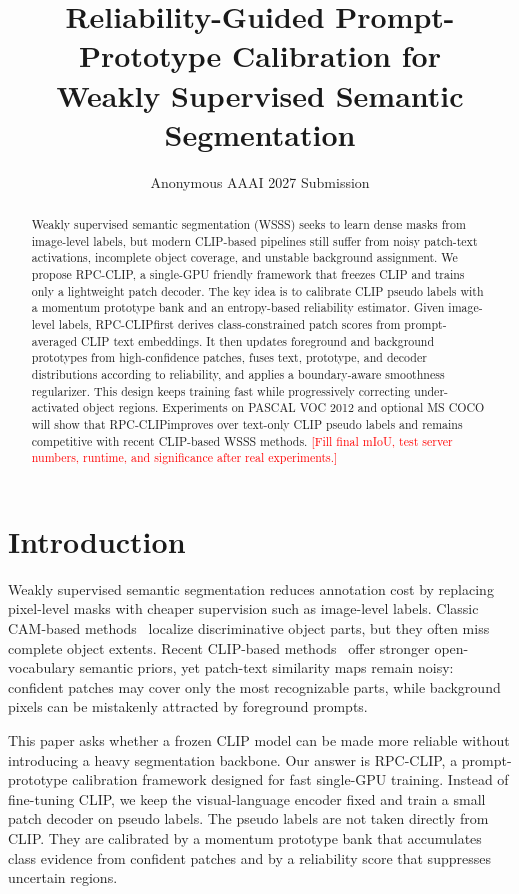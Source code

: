 \documentclass[letterpaper]{article}
\title{Reliability-Guided Prompt-Prototype Calibration for\\Weakly Supervised Semantic Segmentation}
\author{Anonymous AAAI 2027 Submission}
\newcommand{\method}{RPC-CLIP}
\newcommand{\todo}[1]{\textcolor{red}{[#1]}}
\begin{document}
\maketitle

\begin{abstract}
Weakly supervised semantic segmentation (WSSS) seeks to learn dense masks from
image-level labels, but modern CLIP-based pipelines still suffer from noisy
patch-text activations, incomplete object coverage, and unstable background
assignment. We propose \method, a single-GPU friendly framework that freezes
CLIP and trains only a lightweight patch decoder. The key idea is to calibrate
CLIP pseudo labels with a momentum prototype bank and an entropy-based
reliability estimator. Given image-level labels, \method first derives
class-constrained patch scores from prompt-averaged CLIP text embeddings. It then
updates foreground and background prototypes from high-confidence patches, fuses
text, prototype, and decoder distributions according to reliability, and applies
a boundary-aware smoothness regularizer. This design keeps training fast while
progressively correcting under-activated object regions. Experiments on PASCAL
VOC 2012 and optional MS COCO will show that \method improves over text-only
CLIP pseudo labels and remains competitive with recent CLIP-based WSSS methods.
\todo{Fill final mIoU, test server numbers, runtime, and significance after
real experiments.}
\end{abstract}

\section{Introduction}
Weakly supervised semantic segmentation reduces annotation cost by replacing
pixel-level masks with cheaper supervision such as image-level labels. Classic
CAM-based methods~\cite{zhou2016cam} localize discriminative object parts, but
they often miss complete object extents. Recent CLIP-based
methods~\cite{radford2021clip,lin2023clipes,zhang2024weclip} offer stronger
open-vocabulary semantic priors, yet patch-text similarity maps remain noisy:
confident patches may cover only the most recognizable parts, while background
pixels can be mistakenly attracted by foreground prompts.

This paper asks whether a frozen CLIP model can be made more reliable without
introducing a heavy segmentation backbone. Our answer is \method, a
prompt-prototype calibration framework designed for fast single-GPU training.
Instead of fine-tuning CLIP, we keep the visual-language encoder fixed and train
a small patch decoder on pseudo labels. The pseudo labels are not taken directly
from CLIP. They are calibrated by a momentum prototype bank that accumulates
class evidence from confident patches and by a reliability score that suppresses
uncertain regions.
\end{document}
